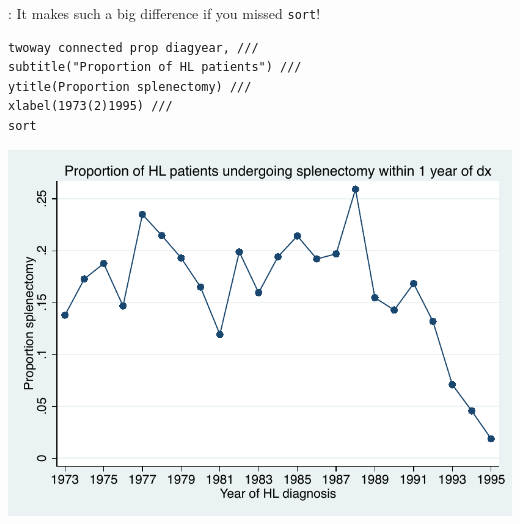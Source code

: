 \begin{frame}[fragile]{\secname: \subsecname}
It makes such a big difference if you missed \verb|sort|!

\small
\begin{verbatim}
twoway connected prop diagyear, ///
subtitle("Proportion of HL patients") ///
ytitle(Proportion splenectomy) ///
xlabel(1973(2)1995) ///
sort	
\end{verbatim}
\begin{center}
	\includegraphics[scale=0.4]{images/sort}
\end{center}

\end{frame}
